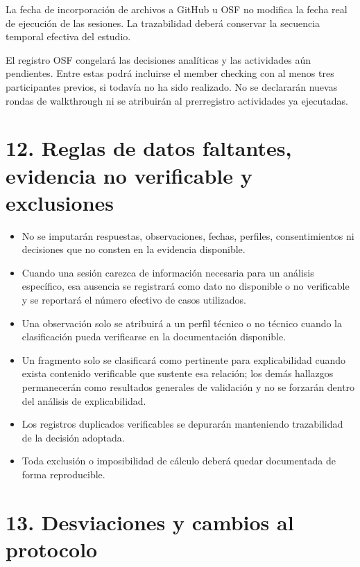 \documentclass[9pt,a4paper]{extarticle}
\begin{document}
La fecha de incorporación de archivos a GitHub u OSF no modifica la fecha real de ejecución de las sesiones. La trazabilidad deberá conservar la secuencia temporal efectiva del estudio.

El registro OSF congelará las decisiones analíticas y las actividades aún pendientes. Entre estas podrá incluirse el member checking con al menos tres participantes previos, si todavía no ha sido realizado. No se declararán nuevas rondas de walkthrough ni se atribuirán al prerregistro actividades ya ejecutadas.

\section*{12. Reglas de datos faltantes, evidencia no verificable y exclusiones}

\begin{itemize}
\item No se imputarán respuestas, observaciones, fechas, perfiles, consentimientos ni decisiones que no consten en la evidencia disponible.
\item Cuando una sesión carezca de información necesaria para un análisis específico, esa ausencia se registrará como dato no disponible o no verificable y se reportará el número efectivo de casos utilizados.
\item Una observación solo se atribuirá a un perfil técnico o no técnico cuando la clasificación pueda verificarse en la documentación disponible.
\item Un fragmento solo se clasificará como pertinente para explicabilidad cuando exista contenido verificable que sustente esa relación; los demás hallazgos permanecerán como resultados generales de validación y no se forzarán dentro del análisis de explicabilidad.
\item Los registros duplicados verificables se depurarán manteniendo trazabilidad de la decisión adoptada.
\item Toda exclusión o imposibilidad de cálculo deberá quedar documentada de forma reproducible.
\end{itemize}

\section*{13. Desviaciones y cambios al protocolo}
\end{document}
